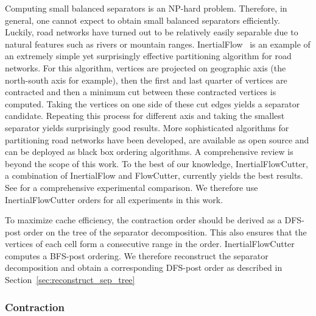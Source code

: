 \documentclass[a4paper, english, cleveref]{lipics-v2021}
\begin{document}
Computing small balanced separators is an \textsf{NP}-hard problem.
Therefore, in general, one cannot expect to obtain small balanced separators efficiently.
Luckily, road networks have turned out to be relatively easily separable due to natural features such as rivers or mountain ranges.
InertialFlow~\cite{TODO} is an example of an extremely simple yet surprisingly effective partitioning algorithm for road networks.
For this algorithm, vertices are projected on geographic axis (the north-south axis for example), then the first and last quarter of vertices are contracted and then a minimum cut between these contracted vertices is computed.
Taking the vertices on one side of these cut edges yields a separator candidate.
Repeating this process for different axis and taking the smallest separator yields surprisingly good results.
More sophisticated algorithms for partitioning road networks have been developed, are available as open source and can be deployed as black box ordering algorithms.
A comprehensive review is beyond the scope of this work.
To the best of our knowledge, InertialFlowCutter, a combination of InertialFlow and FlowCutter, currently yields the best results.
See for a comprehensive experimental comparison.
We therefore use InertialFlowCutter orders for all experiments in this work.

To maximize cache efficiency, the contraction order should be derived as a DFS-post order on the tree of the separator decomposition.
This also ensures that the vertices of each cell form a consecutive range in the order.
InertialFlowCutter computes a BFS-post ordering.
We therefore reconstruct the separator decomposition and obtain a corresponding DFS-post order as described in Section~\ref{sec:reconstruct_sep_tree}

\subsubsection{Contraction}
\end{document}
